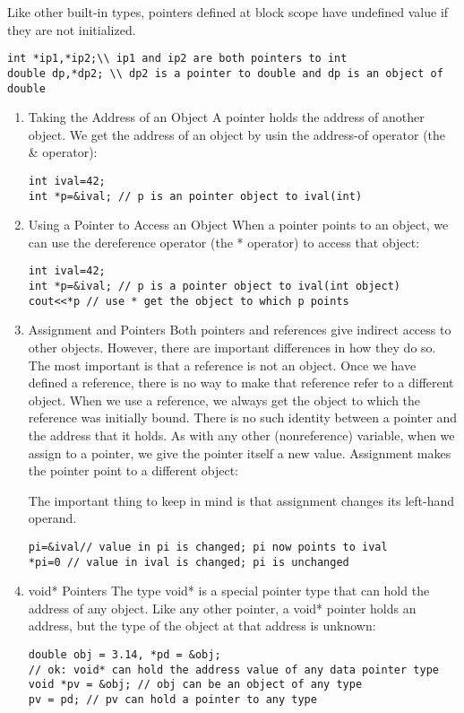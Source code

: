 \documentclass[11pt]{article}
\begin{document}
Like other built-in types, pointers defined at block scope have undefined value if they are not initialized.
\begin{verbatim}
int *ip1,*ip2;\\ ip1 and ip2 are both pointers to int
double dp,*dp2; \\ dp2 is a pointer to double and dp is an object of double
\end{verbatim}
\begin{enumerate}
\item Taking the Address of an Object
\label{sec-2-3-2-1}
A pointer holds the address of another object. We get the address of an object by usin the address-of operator (the \& operator):
\begin{verbatim}
int ival=42;
int *p=&ival; // p is an pointer object to ival(int)
\end{verbatim}
\item Using a Pointer to Access an Object
\label{sec-2-3-2-2}
When a pointer points to an object, we can use the dereference operator (the * operator) to access that object:
\begin{verbatim}
int ival=42;
int *p=&ival; // p is a pointer object to ival(int object)
cout<<*p // use * get the object to which p points
\end{verbatim}
\item Assignment and Pointers
\label{sec-2-3-2-3}
Both pointers and references give indirect access to other objects. However, there are important differences in how they do so. The most important is that a reference is not an object. Once we have defined a reference, there is no way to make that reference refer to a different object. When we use a reference, we always get the object to which the reference was initially bound.
There is no such identity between a pointer and the address that it holds. As with any other (nonreference) variable, when we assign to a pointer, we give the pointer itself a new value. Assignment makes the pointer point to a different object:

The important thing to keep in mind is that assignment changes its left-hand operand.

\begin{verbatim}
pi=&ival// value in pi is changed; pi now points to ival
*pi=0 // value in ival is changed; pi is unchanged
\end{verbatim}
\item void* Pointers
\label{sec-2-3-2-4}
The type void* is a special pointer type that can hold the address of any object. Like any other pointer, a void* pointer holds an address, but the type of the object at that address is unknown:
\begin{verbatim}
double obj = 3.14, *pd = &obj;
// ok: void* can hold the address value of any data pointer type 
void *pv = &obj; // obj can be an object of any type 
pv = pd; // pv can hold a pointer to any type
\end{verbatim}
\end{enumerate}
\end{document}
